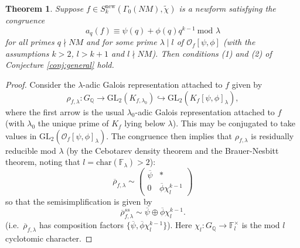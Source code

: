\documentclass{amsart}
\theoremstyle{plain}
\newtheorem{theorem}{Theorem}[section]
\theoremstyle{definition}
\begin{document}
\begin{theorem}
\label{thm:reverse}
Suppose $f \in S_k^{\text{new}}(\Gamma_0(NM), \tilde{\chi})$ is a newform satisfying the congruence \[a_q(f) \equiv \psi(q) + \phi(q)q^{k-1} \ \text{mod } \lambda\] for all primes $q \nmid NM$ and for some prime $\lambda\mid l$ of $\mathcal{O}_f[\psi,\phi]$ (with the assumptions $k>2$, $l>k+1$ and $l\nmid NM$). Then conditions (1) and (2) of Conjecture \ref{conj:general} hold.
\end{theorem}

\begin{proof}
Consider the $\lambda$-adic Galois representation attached to $f$ given by \[\rho_{f,\lambda}: G_{\mathbb{Q}}\rightarrow \text{GL}_2(K_{f,\lambda_0}) \hookrightarrow \text{GL}_2(K_f[\psi,\phi]_{\lambda}),\] where the first arrow is the usual $\lambda_0$-adic Galois representation attached to $f$ (with $\lambda_0$ the unique prime of $K_f$ lying below $\lambda$). This may be conjugated to take values in $\text{GL}_2(\mathcal{O}_f[\psi,\phi]_\lambda)$. The congruence then implies that $\rho_{f,\lambda}$ is residually reducible mod $\lambda$ (by the Cebotarev density theorem and the Brauer-Nesbitt theorem, noting that $l = \text{char}(\mathbb{F}_{\lambda}) > 2$):
\begin{equation*}
\overline{\rho}_{f,\lambda}  \sim   \begin{pmatrix} \overline{\psi} & *\\ 0 & \overline{\phi} \chi_l^{k - 1} \end{pmatrix}
\end{equation*}
so that the semisimplification is given by
\begin{equation}
\label{eq:rep}
    \overline{\rho}_{f,\lambda}^{ss} \sim \overline{\psi} \oplus \overline{\phi} \chi_l^{k-1}.
\end{equation}
(i.e.\ $\overline{\rho}_{f,\lambda}$ has composition factors $\{\overline{\psi}, \overline{\phi}\chi_l^{k-1}\}$). Here $\chi_{l}:G_{\mathbb{Q}}\rightarrow \mathbb{F}_{l}^{\times}$ is the mod $l$ cyclotomic character.


\end{proof}
\end{document}
